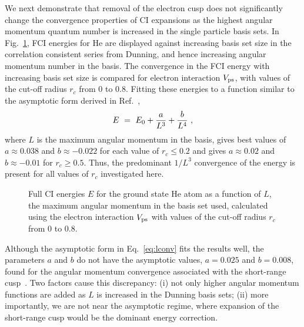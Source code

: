 We next demonstrate that removal of the electron cusp does not
significantly change the convergence properties of CI expansions 
as the highest angular momentum quantum number is increased in 
the single particle basis sets. 
In Fig.~\ref{fig:ci_basis_conv}, FCI energies for He are displayed 
against increasing basis set size in the correlation consistent series 
from Dunning, and hence increasing angular momentum number in the basis. 
The convergence in the FCI energy with increasing basis set size is 
compared for electron interaction $V_{\rm ps}$, with values of the 
cut-off radius $r_c$ from 0 to 0.8.
Fitting these energies to a function similar to the asymptotic form derived in 
Ref.~\cite{Hill}, 
\begin{eqnarray}
E ~=~ E_0 + {a\over L^3}  + {b\over L^4} ~, 
\label{eq:lconv}
\end{eqnarray}
where $L$ is the maximum angular momentum in the basis,
gives best values of $a \approx 0.038$ and $b \approx -0.022$
for each value of $r_c\le0.2$ and gives 
$a \approx 0.02$ and $b \approx -0.01$ for $r_c\ge0.5$.
Thus, the predominant $1/L^3$ convergence of the energy is present for all
values of $r_c$ investigated here.

%
%

\begin{figure}[tb]
\begin{center}
  \leavevmode
  \vspace{0.5cm}
  \caption{
    Full CI energies $E$ for the ground state He atom as a function of $L$, the maximum
    angular momentum in the basis set used, calculated using the electron interaction 
    $V_{\rm ps}$ with values of the cut-off radius $r_c$ from 0 to 0.8.
  }
  \label{fig:ci_basis_conv}
\end{center}
\end{figure}


Although the asymptotic form in Eq.~\ref{eq:lconv} fits the results 
well, the parameters $a$ and $b$ do not have the asymptotic values,
$a = 0.025$ and $b = 0.008$, found for the angular momentum convergence 
associated with the short-range cusp~\cite{Morgan:CIconv}.
Two factors cause this discrepancy: (i) not only higher angular momentum 
functions are added as $L$ is increased in the Dunning basis sets;
(ii) more importantly, we are not near the asymptotic regime, where
expansion of the short-range cusp would be the dominant energy correction.


